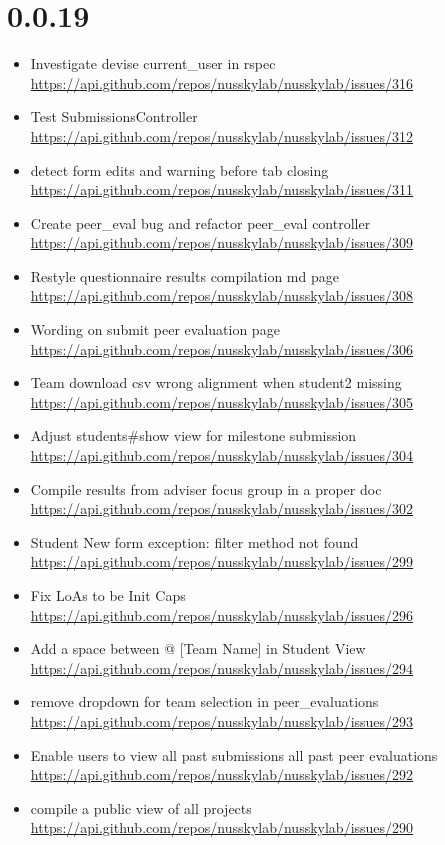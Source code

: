 {\section{0.0.19}
\begin{itemize}[noitemsep]
    \item Investigate devise current\_user in rspec \url{https://api.github.com/repos/nusskylab/nusskylab/issues/316} 
    \item Test SubmissionsController \url{https://api.github.com/repos/nusskylab/nusskylab/issues/312} 
    \item detect form edits and warning before tab closing \url{https://api.github.com/repos/nusskylab/nusskylab/issues/311} 
    \item Create peer\_eval bug and refactor peer\_eval controller \url{https://api.github.com/repos/nusskylab/nusskylab/issues/309} 
    \item Restyle questionnaire results compilation md page \url{https://api.github.com/repos/nusskylab/nusskylab/issues/308} 
    \item Wording on submit peer evaluation page \url{https://api.github.com/repos/nusskylab/nusskylab/issues/306} 
    \item Team download csv wrong alignment when student2 missing \url{https://api.github.com/repos/nusskylab/nusskylab/issues/305} 
    \item Adjust students\#show view for milestone submission \url{https://api.github.com/repos/nusskylab/nusskylab/issues/304} 
    \item Compile results from adviser focus group in a proper doc \url{https://api.github.com/repos/nusskylab/nusskylab/issues/302} 
    \item Student New form exception: filter method not found \url{https://api.github.com/repos/nusskylab/nusskylab/issues/299} 
    \item Fix LoAs to be Init Caps \url{https://api.github.com/repos/nusskylab/nusskylab/issues/296} 
    \item Add a space between @ [Team Name] in Student View \url{https://api.github.com/repos/nusskylab/nusskylab/issues/294} 
    \item remove dropdown for team selection in peer\_evaluations \url{https://api.github.com/repos/nusskylab/nusskylab/issues/293} 
    \item Enable users to view all past submissions  all past peer evaluations \url{https://api.github.com/repos/nusskylab/nusskylab/issues/292} 
    \item compile a public view of all projects \url{https://api.github.com/repos/nusskylab/nusskylab/issues/290} 

\end{itemize}}
